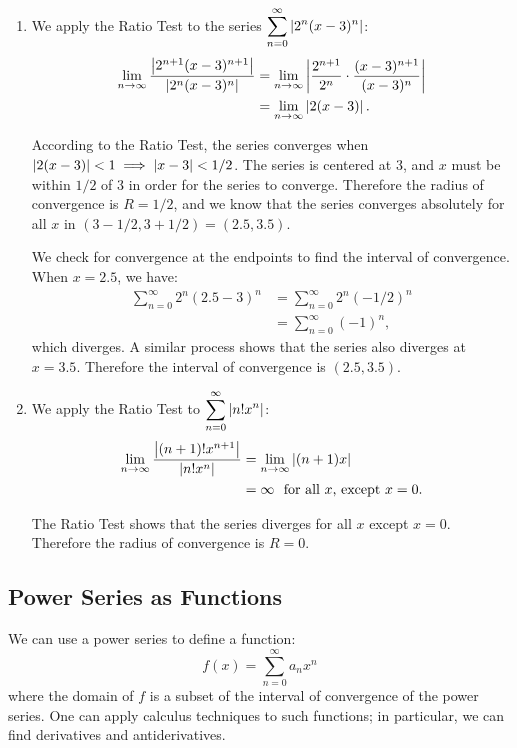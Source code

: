 \begin{example}
\begin{enumerate}
	When $x=1$, we have the series $\ds \sum_{n=1}^\infty (-1)^{n+1}\frac{(1)^n}{n}$, which is the Alternating Harmonic Series, which converges. Therefore the interval of convergence is $(-1,1]$.
	
	\item		We apply the Ratio Test to the series $\displaystyle\sum_{n=0}^\infty \left\lvert 2^n(x-3)^n \right\rvert$:
	\begin{align*}
	\lim_{n\to\infty} \frac{\left\lvert 2^{n+1}(x-3)^{n+1} \right\rvert}{\left\lvert 2^n(x-3)^n \right\rvert} &= \lim_{n\to\infty} \left\lvert \frac{2^{n+1}}{2^n}\cdot\frac{(x-3)^{n+1}}{(x-3)^n} \right\rvert\\
			&=\lim_{n\to\infty} \left\lvert 2(x-3) \right\rvert.
	\end{align*}
	
According to the Ratio Test, the series converges when $\left\lvert 2(x-3) \right\rvert<1 \implies \left\lvert x-3 \right\rvert< 1/2$. The series is centered at 3, and $x$ must be within $1/2$ of 3 in order for the series to converge. Therefore the radius of convergence is $R=1/2$, and we know that the series converges absolutely for all $x$ in $(3-1/2,3+1/2) = (2.5, 3.5)$.

We check for convergence at the endpoints to find the interval of convergence. When $x=2.5$, we have:
\begin{align*}
\sum_{n=0}^\infty 2^n(2.5-3)^n &= \sum_{n=0}^\infty 2^n(-1/2)^n \\
			&=\sum_{n=0}^\infty (-1)^n,
\end{align*}
which diverges. A similar process shows that the series also diverges at $x=3.5$. Therefore the interval of convergence is $(2.5, 3.5)$.

\item		We apply the Ratio Test to $\displaystyle \sum_{n=0}^\infty \left\lvert n!x^n \right\rvert$:
\begin{align*}
\lim_{n\to\infty} \frac{\left\lvert  (n+1)!x^{n+1} \right\rvert}{\left\lvert n!x^n \right\rvert} &= \lim_{n\to\infty} \left\lvert (n+1)x \right\rvert\\
		&= \infty\ \text{ for all $x$, except $x=0$.}
\end{align*}

The Ratio Test shows that the series diverges for all $x$ except $x=0$. Therefore the radius of convergence is $R=0$.
\end{enumerate}
\end{example}

\subsection{Power Series as Functions}

We can use a power series to define a function:
\[f(x) = \sum_{n=0}^\infty a_nx^n\]
where the domain of $f$ is a subset of the interval of convergence of the power series. One can apply calculus techniques to such functions; in particular, we can find derivatives and antiderivatives. 

